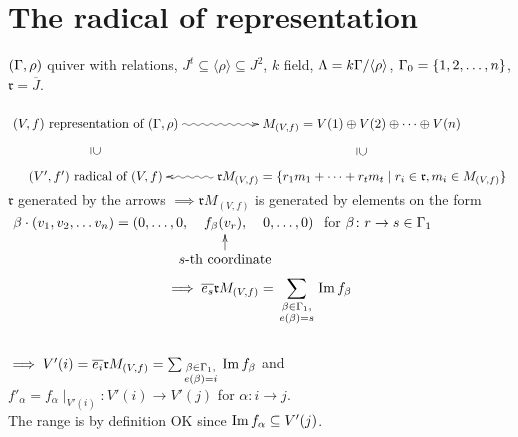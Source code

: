 \section{The radical of representation}
$(\Gamma, \rho)$ quiver with relations, $J^t \subseteq \langle \rho \rangle \subseteq J^2$, $k$ field, $\Lambda = k\Gamma / \langle \rho \rangle$, $\Gamma_0 = \{ 1, 2, \ldots , n \}$, $\mathfrak{r} = \overline{J}$.\\
\\
$\xymatrix
{
(V, f) \text{ representation of } (\G, \rho)\ar@{}[d]|-*[@]{\supseteq}\ar@{~>}[r] & M_{(V, f)} = V(1) \oplus V(2) \oplus \cdots \oplus V(n) \ar@{}[d]|-*[@]{\supseteq}\\
(V', f') \text{ radical of } (V, f)\ar@{<~}[r] & \mathfrak{r}M_{(V, f)} = \{ r_1m_1 + \cdots + r_tm_t \mid r_i \in \mathfrak{r}, m_i \in M_{(V, f)} \}\\
}
$\\
$\mathfrak{r}$ generated by the arrows $\implies \mathfrak{r}M_{(V,f)}$ is generated by elements on the form
$\xymatrix@C-3pc@R-1pc{\beta \cdot (v_1, v_2, \ldots v_n) = (0, \ldots, 0, & f_\beta(v_r), & 0, \ldots , 0 )\\
&s\text{-th coordinate}\ar[u]&}$ for $\beta \colon r \rightarrow s \in \Gamma_1$\\
$$\implies \overline{e_s}\mathfrak{r}M_{(V, f)} = \sum_{\begin{smallmatrix}
\beta \in \Gamma_1,\\ e(\beta)=s
\end{smallmatrix}} \operatorname{Im}\nolimits f_\beta$$\\
$\implies V'(i) =\overline{e_i}\mathfrak{r}M_{(V, f)}= \sum_{\begin{smallmatrix}
\beta \in \Gamma_1,\\ e(\beta)=i
\end{smallmatrix}} \operatorname{Im}\nolimits f_\beta$ and\\ $f'_\alpha = f_\alpha \mid_{V'(i)} \colon V'(i) \rightarrow V'(j)$ for $\alpha\colon i \rightarrow j$.\\
The range is by definition OK since $\operatorname{Im}\nolimits f_\alpha \subseteq V'(j)$.

